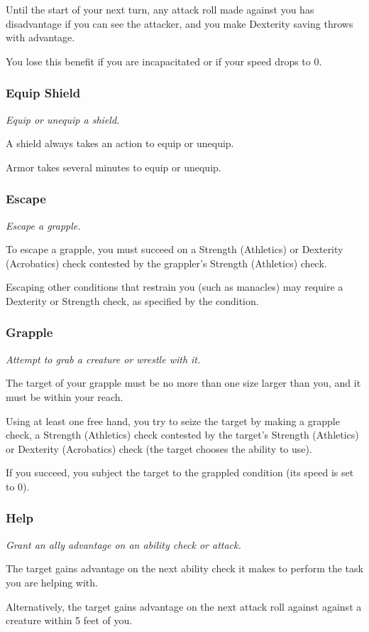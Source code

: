     Until the start of your next turn, any attack roll made against you has disadvantage if you can see the attacker, and you make Dexterity saving throws with advantage.

    You lose this benefit if you are incapacitated or if your speed drops to 0.
\subsubsection{Equip Shield}
    \textit{Equip or unequip a shield.}

    A shield always takes an action to equip or unequip.

    Armor takes several minutes to equip or unequip.
\subsubsection{Escape}
    \textit{Escape a grapple.}

    To escape a grapple, you must succeed on a Strength (Athletics) or Dexterity (Acrobatics) check contested by the grappler's Strength (Athletics) check.

    Escaping other conditions that restrain you (such as manacles) may require a Dexterity or Strength check, as specified by the condition.
\subsubsection{Grapple}
    \textit{Attempt to grab a creature or wrestle with it.}

    The target of your grapple must be no more than one size larger than you, and it must be within your reach.

    Using at least one free hand, you try to seize the target by making a grapple check, a Strength (Athletics) check contested by the target's Strength (Athletics) or Dexterity (Acrobatics) check (the target chooses the ability to use).

    If you succeed, you subject the target to the grappled condition (its speed is set to 0).
\subsubsection{Help}
    \textit{Grant an ally advantage on an ability check or attack.}

    The target gains advantage on the next ability check it makes to perform the task you are helping with.

    Alternatively, the target gains advantage on the next attack roll against against a creature within 5 feet of you.

